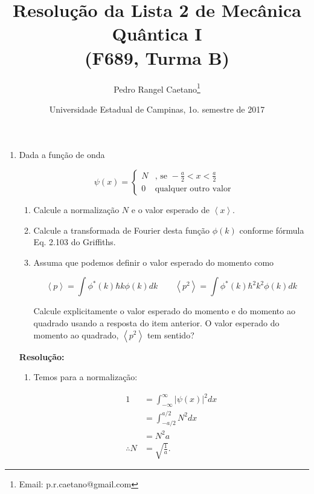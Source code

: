 \documentclass[a4paper, 12pt, notitlepage]{article}
\begin{document}
\title{Resolução da Lista 2 de Mecânica Quântica I\\ (F689, Turma B)}
\author{Pedro Rangel Caetano\footnote{Email: p.r.caetano@gmail.com}} 
\date{Universidade Estadual de Campinas, 1o. semestre de 2017}
\maketitle

\tableofcontents
\pagebreak

\begin{enumerate}

\item Dada a função de onda  

\begin{equation*}
  \psi(x) = \begin{cases}N &\text{, se }-\frac{a}{2} < x < \frac{a}{2} \\
  0&\text{qualquer outro valor} \end{cases}
\end{equation*}

\begin{enumerate}
  \item Calcule a normalização $N$ e o valor esperado de $\left\langle x \right\rangle$.
  \item Calcule a transformada de Fourier desta função $\phi(k)$ conforme fórmula Eq. 2.103 do Griffiths.
  \item Assuma que podemos definir o valor esperado do momento como
  
  \begin{equation*}
    \left\langle p \right\rangle = \int \phi^{\ast}(k)\hbar k \phi(k) dk \qquad \left\langle p^2 \right\rangle = \int \phi^{\ast}(k) \hbar^2 k^2 \phi(k) dk
  \end{equation*}
  
  Calcule explicitamente o valor esperado do momento e do momento ao quadrado usando a resposta do item anterior. O valor esperado do momento ao quadrado, $\left\langle p^2 \right\rangle$ tem sentido?
\end{enumerate}

\textbf{Resolução:}\newline
  \begin{enumerate}
    \item
    Temos para a normalização:
  
    \begin{align*}
    1 &= \int_{-\infty}^{\infty} |\psi(x)|^2 dx \\
    &= \int_{-a/2}^{a/2} N^2 dx \\
    &= N^2 a \\
    \therefore N &= \sqrt{\frac{1}{a}}.
    \end{align*}
  

\end{enumerate}
\end{enumerate}
\end{document}
